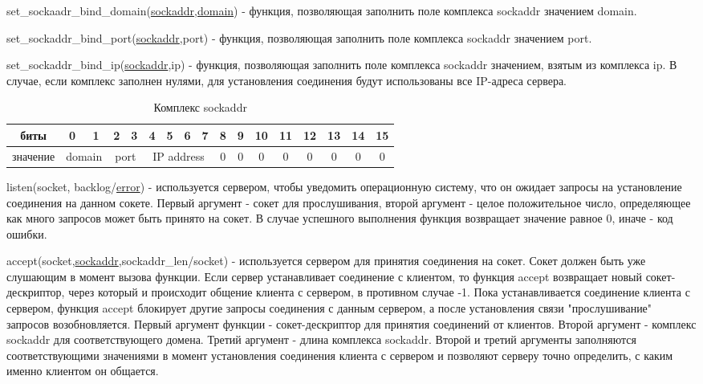 \documentclass[12t]{article}
\begin{document}
\label{set_sockaddr_bind_domain}
set\_sockaadr\_bind\_domain(\hyperref[sockaddr]{sockaddr},\hyperref[domain]{domain}) - функция, позволяющая заполнить поле комплекса sockaddr значением domain.

\label{set_sockaddr_bind_port}
set\_sockaddr\_bind\_port(\hyperref[sockaddr]{sockaddr},port) - функция, позволяющая заполнить поле комплекса sockaddr значением port.

\label{set_sockaddr_bind_ip}
set\_sockaddr\_bind\_ip(\hyperref[sockaddr]{sockaddr},ip) - функция, позволяющая заполнить поле комплекса sockaddr значением, взятым из комплекса ip. В случае, если комплекс заполнен нулями, для установления соединения будут использованы все IP-адреса сервера.

\begin{table}[H]
\caption{\label{sockaddr}Комплекс sockaddr}
\begin{center}
\begin{tabular}{|c|c|c|c|c|c|c|c|c|c|c|c|c|c|c|c|c|}
\hline
биты & 0 & 1 & 2 & 3 & 4 & 5 & 6 & 7 & 8 & 9 & 10 & 11 & 12 & 13 & 14 & 15 \\
\hline
значение & \multicolumn{2}{|c|}{domain} & \multicolumn{2}{|c|}{port} & \multicolumn{4}{|c|}{IP address} & 0 & 0 & 0 & 0 & 0 & 0 & 0 & 0 \\
\hline
\end{tabular}
\end{center}
\end{table}

\label{listen}
listen(socket, backlog/\hyperref[error]{error}) - используется сервером, чтобы уведомить операционную систему, что он ожидает запросы на установление соединения на данном сокете. Первый аргумент - сокет для прослушивания, второй аргумент - целое положительное число, определяющее как много запросов может быть принято на сокет. В случае успешного выполнения функция возвращает значение равное 0, иначе - код ошибки.

\label{accept}
accept(socket,\hyperref[sockaddr]{sockaddr},sockaddr\_len/socket) - используется сервером для принятия соединения на сокет. Сокет должен быть уже слушающим в момент вызова функции. Если сервер устанавливает соединение с клиентом, то функция accept возвращает новый сокет-дескриптор, через который и происходит общение клиента с сервером, в противном случае -1. Пока устанавливается соединение клиента с сервером, функция accept блокирует другие запросы соединения с данным сервером, а после установления связи "прослушивание" запросов возобновляется. Первый аргумент функции - сокет-дескриптор для принятия соединений от клиентов. Второй аргумент - комплекс sockaddr для соответствующего домена. Третий аргумент - длина комплекса sockaddr. Второй и третий аргументы заполняются соответствующими значениями в момент установления соединения клиента с сервером и позволяют серверу точно определить, с каким именно клиентом он общается.
\end{document}
